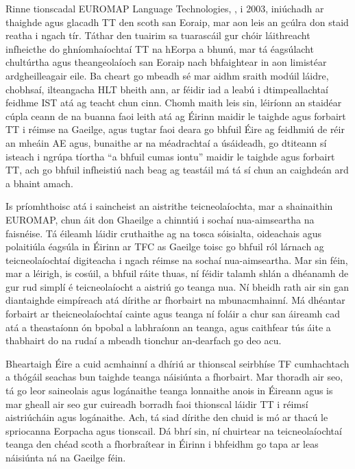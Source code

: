 \begin{multicols}{2}
Rinne tionscadal EUROMAP Language Technologies, \cite{euromap}, i 2003, iniúchadh ar thaighde agus glacadh TT den scoth san Eoraip, mar aon leis an gcúlra don staid reatha i ngach tír. Táthar den tuairim sa tuarascáil gur chóir láithreacht infheicthe do ghníomhaíochtaí TT na hEorpa a bhunú, mar tá éagsúlacht chultúrtha agus theangeolaíoch san Eoraip nach bhfaightear in aon limistéar ardgheilleagair eile. Ba cheart go mbeadh sé mar aidhm sraith modúil láidre, chobhsaí, ilteangacha HLT bheith ann, ar féidir iad a leabú i dtimpeallachtaí feidhme IST atá ag teacht chun cinn. Chomh maith leis sin, léiríonn an staidéar cúpla ceann de na buanna faoi leith atá ag Éirinn maidir le taighde agus forbairt TT i réimse na Gaeilge, agus tugtar faoi deara go bhfuil Éire ag feidhmiú de réir an mheáin AE agus, bunaithe ar na méadrachtaí a úsáideadh, go dtiteann sí isteach i ngrúpa tíortha ``a bhfuil cumas iontu'' maidir le taighde agus forbairt TT, ach go bhfuil infheistiú nach beag ag teastáil má tá sí chun an caighdeán ard a bhaint amach.



Is príomhthoisc atá i saincheist an aistrithe teicneolaíochta, mar a shainaithin EUROMAP, chun áit don Ghaeilge a chinntiú i sochaí nua-aimseartha na faisnéise.  Tá éileamh láidir cruthaithe ag na tosca sóisialta, oideachais agus polaitiúla éagsúla in Éirinn ar TFC as Gaeilge toisc go bhfuil ról lárnach ag teicneolaíochtaí digiteacha i ngach réimse na sochaí nua-aimseartha. Mar sin féin, mar a léirigh, is cosúil, a bhfuil ráite thuas, ní féidir talamh shlán a dhéanamh de gur rud simplí é teicneolaíocht a aistriú go teanga nua. Ní bheidh rath air sin gan diantaighde eimpíreach atá dírithe ar fhorbairt na mbunacmhainní. Má dhéantar forbairt ar theicneolaíochtaí cainte agus teanga ní foláir a chur san áireamh cad atá a theastaíonn ón bpobal a labhraíonn an teanga, agus caithfear tús áite a thabhairt do na rudaí a mbeadh tionchur an-dearfach go deo acu.

Bheartaigh Éire a cuid acmhainní a dhíriú ar thionscal seirbhíse TF cumhachtach a thógáil seachas bun taighde teanga náisiúnta a fhorbairt. Mar thoradh air seo, tá go leor saineolais agus logánaithe teanga lonnaithe anois in Éireann  agus is mar gheall air seo gur cuireadh borradh faoi thionscal láidir TT i réimsí aistriúcháin agus logánaithe. Ach, tá siad dírithe den chuid is mó ar thacú le spriocanna Eorpacha agus tionscail. Dá bhrí sin, ní chuirtear na teicneolaíochtaí teanga den chéad scoth a fhorbraítear in Éirinn i bhfeidhm go tapa ar leas náisiúnta ná na Gaeilge féin.


\end{multicols}
